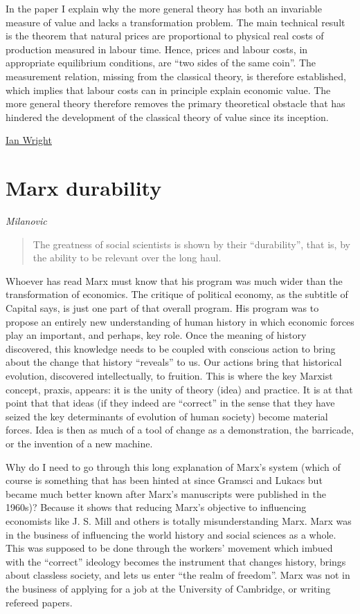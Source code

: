 \documentclass[
]{book}
\begin{document}
In the paper I explain why the more general theory has both an invariable measure of value and lacks a transformation problem. The main technical result is the theorem that natural prices are proportional to physical real costs of production measured in labour time. Hence, prices and labour costs, in appropriate equilibrium conditions, are ``two sides of the same coin''. The measurement relation, missing from the classical theory, is therefore established, which implies that labour costs can in principle explain economic value. The more general theory therefore removes the primary theoretical obstacle that has hindered the development of the classical theory of value since its inception.

\href{https://ianwrightsite.wordpress.com/2017/06/30/a-category-mistake-in-the-classical-labour-theory-of-value/}{Ian Wright}

\hypertarget{marx-durability}{%
\section{Marx durability}\label{marx-durability}}

\emph{Milanovic}

\begin{quote}
The greatness of social scientists is shown by their ``durability'', that is, by the ability to be relevant over the long haul.
\end{quote}

Whoever has read Marx must know that his program was much wider than the transformation of economics. The critique of political economy, as the subtitle of Capital says, is just one part of that overall program. His program was to propose an entirely new understanding of human history in which economic forces play an important, and perhaps, key role. Once the meaning of history discovered, this knowledge needs to be coupled with conscious action to bring about the change that history ``reveals'' to us. Our actions bring that historical evolution, discovered intellectually, to fruition. This is where the key Marxist concept, praxis, appears: it is the unity of theory (idea) and practice. It is at that point that that ideas (if they indeed are ``correct'' in the sense that they have seized the key determinants of evolution of human society) become material forces. Idea is then as much of a tool of change as a demonstration, the barricade, or the invention of a new machine.

Why do I need to go through this long explanation of Marx's system (which of course is something that has been hinted at since Gramsci and Lukacs but became much better known after Marx's manuscripts were published in the 1960s)? Because it shows that reducing Marx's objective to influencing economists like J. S. Mill and others is totally misunderstanding Marx. Marx was in the business of influencing the world history and social sciences as a whole. This was supposed to be done through the workers' movement which imbued with the ``correct'' ideology becomes the instrument that changes history, brings about classless society, and lets us enter ``the realm of freedom''. Marx was not in the business of applying for a job at the University of Cambridge, or writing refereed papers.
\end{document}
